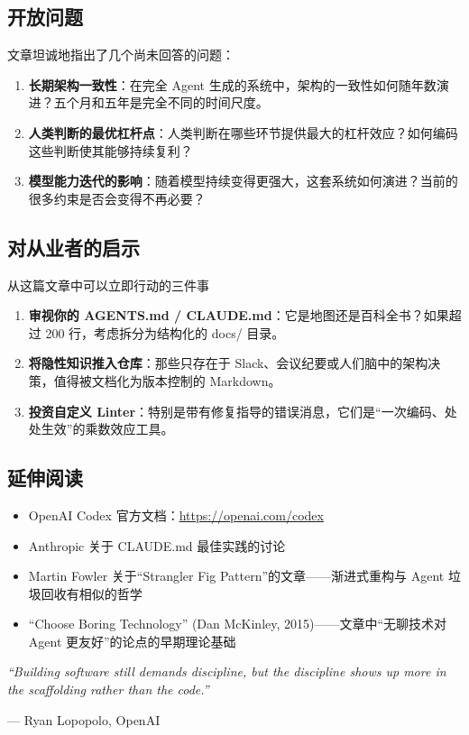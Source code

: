 \documentclass[a4paper]{article}
\begin{document}
\subsection{开放问题}

文章坦诚地指出了几个尚未回答的问题：

\begin{enumerate}[nosep]
  \item \textbf{长期架构一致性}：在完全 Agent 生成的系统中，架构的一致性如何随年数演进？五个月和五年是完全不同的时间尺度。
  \item \textbf{人类判断的最优杠杆点}：人类判断在哪些环节提供最大的杠杆效应？如何编码这些判断使其能够持续复利？
  \item \textbf{模型能力迭代的影响}：随着模型持续变得更强大，这套系统如何演进？当前的很多约束是否会变得不再必要？
\end{enumerate}

\subsection{对从业者的启示}

\begin{knowledgebox}{从这篇文章中可以立即行动的三件事}
\begin{enumerate}[nosep]
  \item \textbf{审视你的 AGENTS.md / CLAUDE.md}：它是地图还是百科全书？如果超过 200 行，考虑拆分为结构化的 docs/ 目录。
  \item \textbf{将隐性知识推入仓库}：那些只存在于 Slack、会议纪要或人们脑中的架构决策，值得被文档化为版本控制的 Markdown。
  \item \textbf{投资自定义 Linter}：特别是带有修复指导的错误消息，它们是``一次编码、处处生效''的乘数效应工具。
\end{enumerate}
\end{knowledgebox}

\subsection{延伸阅读}

\begin{itemize}[nosep]
  \item OpenAI Codex 官方文档：\url{https://openai.com/codex}
  \item Anthropic 关于 CLAUDE.md 最佳实践的讨论
  \item Martin Fowler 关于``Strangler Fig Pattern''的文章——渐进式重构与 Agent 垃圾回收有相似的哲学
  \item ``Choose Boring Technology'' (Dan McKinley, 2015)——文章中``无聊技术对 Agent 更友好''的论点的早期理论基础
\end{itemize}

\vspace{1em}

\begin{center}
\textit{``Building software still demands discipline, but the discipline shows up more in the scaffolding rather than the code.''}

--- Ryan Lopopolo, OpenAI
\end{center}

\end{document}
